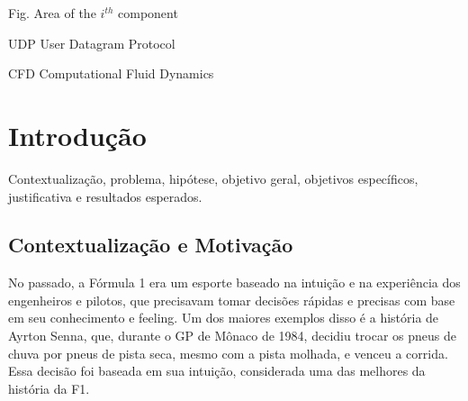 \documentclass[12pt, %
openright, 
oneside, %
a4paper,    %
brazil]{facom-ufu-abntex2}
\begin{document}
\begin{siglas} %
  \item[Fig.] Area of the $i^{th}$ component
  \item[UDP] User Datagram Protocol
  \item[CFD] Computational Fluid Dynamics
\end{siglas}


\tableofcontents*
\cleardoublepage





\textual



\chapter[Introdução]{Introdução}
Contextualização, problema, hipótese, objetivo geral, objetivos específicos, justificativa e resultados esperados.
\section{Contextualização e Motivação}

No passado, a Fórmula 1 era um esporte baseado na intuição e na experiência dos engenheiros e pilotos, que precisavam tomar decisões rápidas e precisas com base em seu conhecimento e feeling. Um dos maiores exemplos
disso é a história de Ayrton Senna, que, durante o GP de Mônaco de 1984, decidiu trocar os pneus de chuva por pneus de pista seca, mesmo com a pista molhada, e venceu a corrida. Essa decisão foi baseada em sua intuição,
considerada uma das melhores da história da F1.
\end{document}
